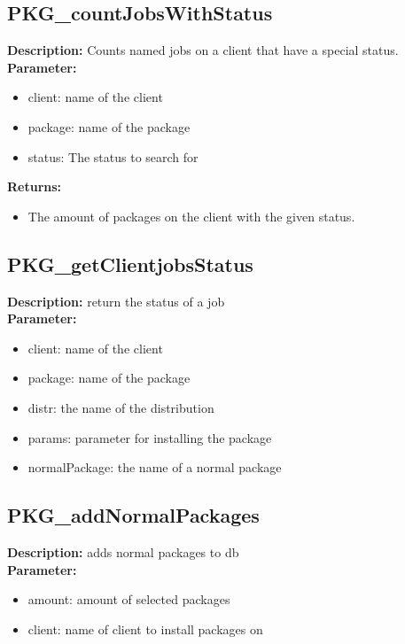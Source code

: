 \subsection{PKG\_countJobsWithStatus}
\textbf{Description:} Counts named jobs on a client that have a special status.\\
\textbf{Parameter:}
\begin{itemize}
\item client: name of the client
\item package: name of the package
\item status: The status to search for
\end{itemize}
\textbf{Returns:}
\begin{itemize}
\item The amount of packages on the client with the given status.
\end{itemize}

\subsection{PKG\_getClientjobsStatus}
\textbf{Description:} return the status of a job\\
\textbf{Parameter:}
\begin{itemize}
\item client: name of the client
\item package: name of the package
\item distr: the name of the distribution
\item params: parameter for installing the package
\item normalPackage: the name of a normal package
\end{itemize}

\subsection{PKG\_addNormalPackages}
\textbf{Description:} adds normal packages to db\\
\textbf{Parameter:}
\begin{itemize}
\item amount: amount of selected packages
\item client: name of client to install packages on
\end{itemize}

